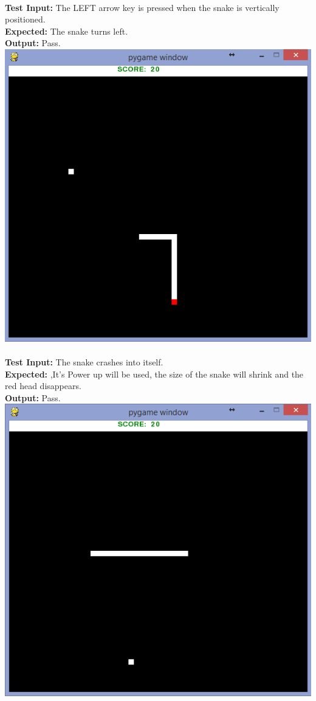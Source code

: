 \documentclass[12pt]{article}
\begin{document}
\\
\textbf{Test Input:} The LEFT arrow key is pressed when the snake is vertically positioned.\\
\textbf{Expected:} The snake turns left.\\
\textbf{Output:} Pass.\\
\pagebreak
\includegraphics[width=\textwidth]{snakeleft.png}\\
\\
\textbf{Test Input:} The snake crashes into itself.\\
\textbf{Expected:} ,It's Power up will be used, the size of the snake will shrink and the red head disappears.\\
\textbf{Output:} Pass.\\
\pagebreak
\includegraphics[width=\textwidth]{powerup.png}\\
\end{document}
